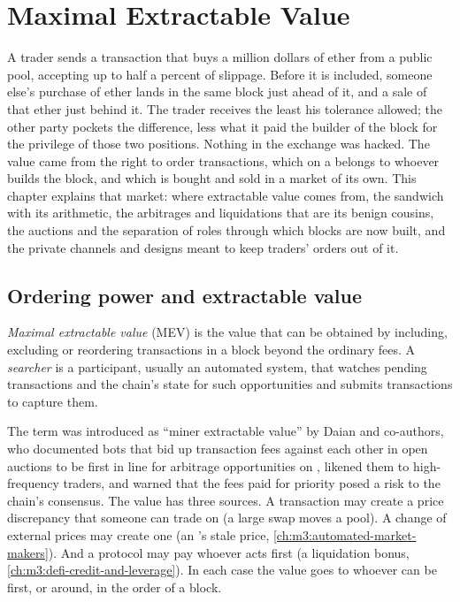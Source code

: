 \chapter{Maximal Extractable Value}\label{ch:m3:maximal-extractable-value}

A trader sends a transaction that buys a million dollars of ether from a public pool, accepting up to
half a percent of slippage. Before it is included, someone else's purchase of ether lands in the same
block just ahead of it, and a sale of that ether just behind it. The trader receives the least his
tolerance allowed; the other party pockets the difference, less what it paid the builder of the block for
the privilege of those two positions. Nothing in the exchange was hacked. The value came from the right to
order transactions, which on a  belongs to whoever builds the block, and which is bought and
sold in a market of its own. This chapter explains that market: where extractable value comes from, the
sandwich with its arithmetic, the arbitrages and liquidations that are its benign cousins, the auctions and
the separation of roles through which blocks are now built, and the private channels and designs meant to
keep traders' orders out of it.

\section{Ordering power and extractable value}

\begin{definition}\label{def:m3:maximal-extractable-value:mev}
\emph{Maximal extractable value} (MEV) is the value that can be obtained by
including, excluding or reordering transactions in a block beyond the ordinary fees. A
\emph{searcher} is a participant, usually an automated system, that watches pending
transactions and the chain's state for such opportunities and submits transactions to capture them.
\end{definition}

The term was introduced as ``miner extractable value'' by Daian and co-authors, who documented bots that bid up
transaction fees against each other in open auctions to be first in line for arbitrage opportunities on
, likened them to high-frequency traders, and warned that the fees paid for priority posed a
risk to the chain's consensus. The value has three sources. A transaction may create a price discrepancy that
someone can trade on (a large swap moves a pool). A change of external prices may create one (an 's stale price, \cref{ch:m3:automated-market-makers}). And a protocol may pay whoever acts first (a
liquidation bonus, \cref{ch:m3:defi-credit-and-leverage}). In each case the value goes to whoever can be first, or
around, in the order of a block.

